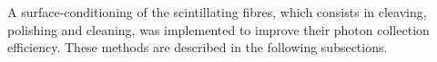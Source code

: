 A surface-conditioning of the scintillating fibres, which consists in cleaving, polishing and cleaning, was implemented to improve their photon collection efficiency. These methods are described in the following subsections.

